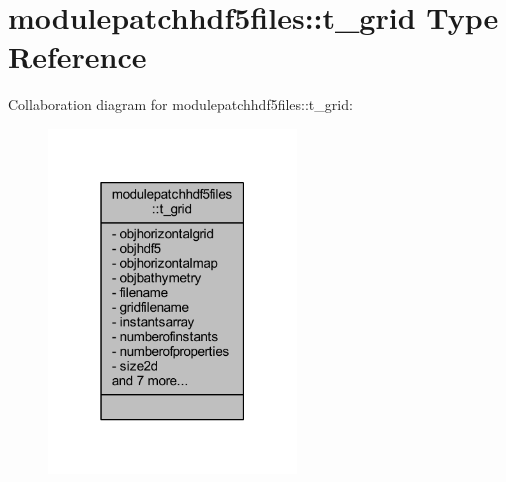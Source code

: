 \hypertarget{structmodulepatchhdf5files_1_1t__grid}{}\section{modulepatchhdf5files\+:\+:t\+\_\+grid Type Reference}
\label{structmodulepatchhdf5files_1_1t__grid}


Collaboration diagram for modulepatchhdf5files\+:\+:t\+\_\+grid\+:\nopagebreak
\begin{figure}[H]
\begin{center}
\leavevmode
\includegraphics[width=187pt]{structmodulepatchhdf5files_1_1t__grid__coll__graph}
\end{center}
\end{figure}

